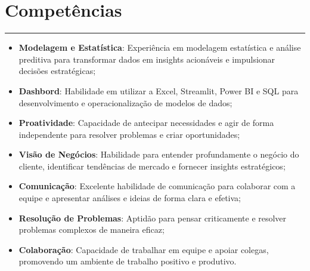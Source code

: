\documentclass[10pt]{article}
\begin{document}
\vspace{-5pt}

\section*{Competências}
\vspace{-15pt}
\rule{\linewidth}{1pt}
\begin{itemize} \itemsep -2pt
    \item \textbf{Modelagem e Estatística}: Experiência em modelagem estatística e análise preditiva para transformar dados em insights acionáveis e impulsionar decisões estratégicas;
    \item \textbf{Dashbord}: Habilidade em utilizar a Excel, Streamlit, Power BI e SQL para desenvolvimento e operacionalização de modelos de dados;
    \item \textbf{Proatividade}: Capacidade de antecipar necessidades e agir de forma independente para resolver problemas e criar oportunidades;
    \item \textbf{Visão de Negócios}: Habilidade para entender profundamente o negócio do cliente, identificar tendências de mercado e fornecer insights estratégicos;
    \item \textbf{Comunicação}: Excelente habilidade de comunicação para colaborar com a equipe e apresentar análises e ideias de forma clara e efetiva;
    \item \textbf{Resolução de Problemas}: Aptidão para pensar criticamente e resolver problemas complexos de maneira eficaz;
    \item \textbf{Colaboração}: Capacidade de trabalhar em equipe e apoiar colegas, promovendo um ambiente de trabalho positivo e produtivo.
\end{itemize}

\end{document}
